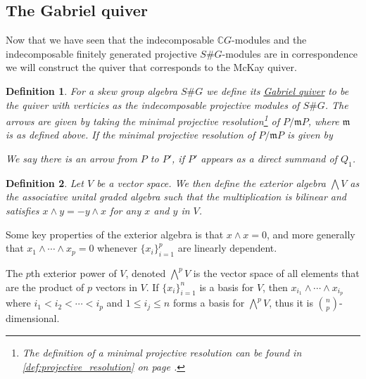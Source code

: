 \documentclass[11pt, a4paper, english]{article}
\numberwithin{prop}{section}
\numberwithin{lemma}{section}
\numberwithin{theorem}{section}
\newtheorem{defin}{Definition}
\numberwithin{defin}{section}
\numberwithin{example}{section}
\newcommand{\C}{\mathbb{C}}
\begin{document}
\subsection{The Gabriel quiver}
Now that we have seen that the indecomposable $\C G$-modules and the indecomposable finitely generated projective $S\#G$-modules are in correspondence we will construct the quiver that corresponds to the McKay quiver.

\begin{defin}
For a skew group algebra $S\#G$ we define its \underline{Gabriel quiver} to be the quiver with verticies as the indecomposable projective modules of $S\#G$. The arrows are given by taking the minimal projective resolution\footnote{The definition of a minimal projective resolution can be found in \cref{def:projective_resolution} on page \pageref{def:projective_resolution}.} of $P/\mathfrak{m}P$, where $\mathfrak{m}$ is as defined above. If the minimal projective resolution of $P/\mathfrak{m}P$ is given by
\begin{center}
\end{center}
We say there is an arrow from $P$ to $P'$, if $P'$ appears as a direct summand of $Q_1$.
\end{defin}

\begin{defin}
Let $V$ be a vector space. We then define the exterior algebra $\bigwedge V$ as the associative unital graded algebra such that the multiplication is bilinear and satisfies $x \wedge y = -y \wedge x$ for any $x$ and $y$ in $V$. 
\end{defin}
Some key properties of the exterior algebra is that $x \wedge x = 0$, and more generally that $x_1 \wedge \cdots \wedge x_p = 0$ whenever $\{x_i\}_{i=1}^p$ are linearly dependent.

The $p$th exterior power of $V$, denoted $\bigwedge\limits^p V$ is the vector space of all elements that are the product of $p$ vectors in $V$. If $\{ x_i \}_{i=1}^n$ is a basis for $V$, then $x_{i_1} \wedge \cdots \wedge x_{i_p}$ where $i_1 < i_2 < \cdots < i_p$ and $1 \leq i_j \leq n$ forms a basis for $\bigwedge\limits^p V$, thus it is ${n \choose p}$-dimensional.  
\end{document}
